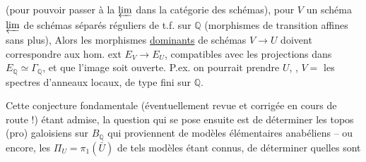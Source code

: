 (pour pouvoir passer à la $\varprojlim$ dans la catégorie des schémas), pour $V$ un schéma $\varprojlim$ de schémas séparés réguliers de t.f. sur $\mathbb{Q}$ (morphismes de transition  affines sans plus), Alors les morphismes \uline{dominants} de schémas $V\longrightarrow U$ doivent correspondre aux hom. ext $E_V\longrightarrow E_U$, compatibles avec les projections dans $E_{\mathbb{Q}}\simeq\Gamma_{\mathbb{Q}}$, et  que l'image soit ouverte. P.ex. on pourrait prendre  $U$, , $V=$ les spectres d'anneaux locaux,  de type fini sur $\mathbb{Q}$.


Cette conjecture fondamentale (éventuellement revue et corrigée en cours de route !) étant admise, la question qui se pose ensuite est de déterminer les topos (pro) galoisiens sur $B_{\mathbb{Q}}$ qui proviennent de modèles élémentaires anabéliens -- ou encore, les $\Pi_U=\pi_1(\bar U)$ de tels modèles étant connus, de déterminer quelles sont
